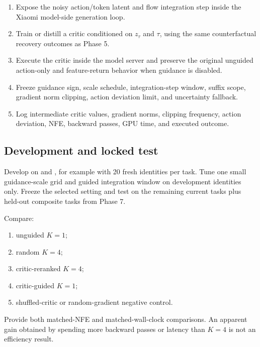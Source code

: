 \begin{enumerate}
  \item Expose the noisy action/token latent and flow integration step inside the Xiaomi model-side generation loop.
  \item Train or distill a critic conditioned on $z_{\tau}$ and $\tau$, using the same counterfactual recovery outcomes as Phase 5.
  \item Execute the critic inside the model server and preserve the original unguided action-only and feature-return behavior when guidance is disabled.
  \item Freeze guidance sign, scale schedule, integration-step window, suffix scope, gradient norm clipping, action deviation limit, and uncertainty fallback.
  \item Log intermediate critic values, gradient norms, clipping frequency, action deviation, NFE, backward passes, GPU time, and executed outcome.
\end{enumerate}


\subsection{Development and locked test}

Develop on  and , for example with 20 fresh identities per task. Tune one small guidance-scale grid and guided integration window on development identities only. Freeze the selected setting and test on the remaining current tasks plus held-out composite tasks from Phase 7.

Compare:
\begin{enumerate}
  \item unguided $K=1$;
  \item random $K=4$;
  \item critic-reranked $K=4$;
  \item critic-guided $K=1$;
  \item shuffled-critic or random-gradient negative control.
\end{enumerate}
Provide both matched-NFE and matched-wall-clock comparisons. An apparent gain obtained by spending more backward passes or latency than $K=4$ is not an efficiency result.

